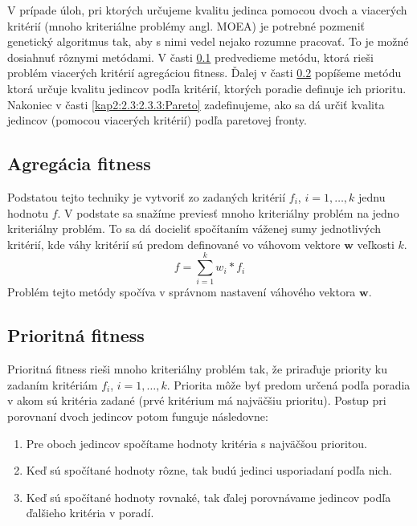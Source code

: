 V prípade úloh, pri ktorých určujeme kvalitu jedinca pomocou dvoch a viacerých kritérií (mnoho kriteriálne problémy angl. MOEA) je potrebné pozmeniť genetický algoritmus tak, aby s nimi vedel nejako rozumne pracovať. To je možné dosiahnuť rôznymi metódami.
V časti \ref{kap2:2.3:2.3.1:Weighted} predvedieme metódu, ktorá rieši problém viacerých kritérií agregáciou fitness. Ďalej v časti \ref{kap2:2.3:2.3.2:Priority} popíšeme metódu ktorá určuje kvalitu jedincov podľa kritérií, ktorých poradie definuje ich prioritu. Nakoniec v časti \ref{kap2:2.3:2.3.3:Pareto} zadefinujeme, ako sa dá určiť kvalita jedincov (pomocou viacerých kritérií) podľa paretovej fronty.

\subsection{Agregácia fitness}\label{kap2:2.3:2.3.1:Weighted}
Podstatou tejto techniky je vytvoriť zo zadaných kritérií $f_{i}$, $i=1,\ldots,k$ jednu hodnotu $f$. V podstate sa snažíme previesť mnoho kriteriálny problém na jedno kriteriálny problém. To sa dá docieliť spočítaním váženej sumy jednotlivých kritérií, kde váhy kritérií sú predom definované vo váhovom vektore $\mathbf{w}$ veľkosti $k$.
\begin{equation}
f = \sum_{i=1}^{k} w_{i} * f_{i} \nonumber
\end{equation}
Problém tejto metódy spočíva v správnom nastavení váhového vektora $\mathbf{w}$.
\subsection{Prioritná fitness}\label{kap2:2.3:2.3.2:Priority}
Prioritná fitness rieši mnoho kriteriálny problém tak, že priraďuje priority ku zadaním kritériám $f_{i}$, $i=1,\ldots,k$. Priorita môže byť predom určená podľa poradia v akom sú kritéria zadané (prvé kritérium má najväčšiu prioritu). Postup pri porovnaní dvoch jedincov potom funguje následovne:
\begin{enumerate}
\item Pre oboch jedincov spočítame hodnoty kritéria s najväčšou prioritou.
\item Keď sú spočítané hodnoty rôzne, tak budú jedinci usporiadaní podľa nich.
\item Keď sú spočítané hodnoty rovnaké, tak ďalej porovnávame jedincov podľa ďalšieho kritéria v poradí.
\end{enumerate}

